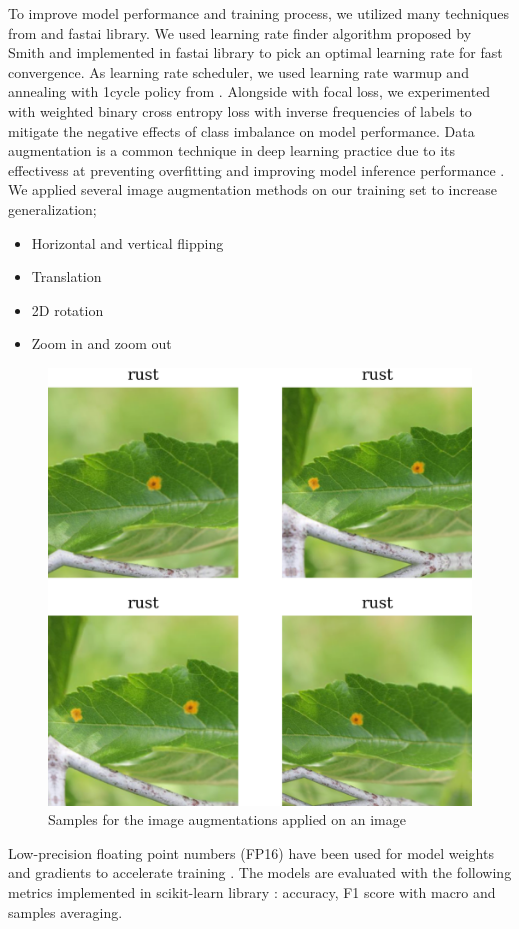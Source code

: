\documentclass[conference]{IEEEtran}
\begin{document}
To improve model performance and training process, 
we utilized many techniques from \cite{BagOfTricks} and fastai \cite{fastai} library.
We used learning rate finder algorithm proposed by Smith \cite{Smith2015}
and implemented in fastai library to pick an optimal learning rate for fast convergence.
As learning rate scheduler, we used learning rate warmup and annealing \cite{BagOfTricks}
with 1cycle policy from \cite{Smith2018}. Alongside with focal loss, 
we experimented with weighted binary cross entropy loss with inverse 
frequencies of labels to mitigate the negative effects of class imbalance 
on model performance. 
Data augmentation is a common technique in deep learning practice due to its 
effectivess at preventing overfitting and improving model inference performance \cite{Shorten2019}.
We applied several image augmentation methods on our training set 
to increase generalization;
\begin{itemize}
    \item Horizontal and vertical flipping
    \item Translation
    \item 2D rotation
    \item Zoom in and zoom out
\end{itemize}

\begin{figure}[h]
    \centerline{\includegraphics[width = 0.45 \textwidth]{image-aug-3x3.png}}
    \caption{Samples for the image augmentations applied on an image}
    \label{fig:image-aug}
\end{figure}

Low-precision floating point numbers (FP16) have been used 
for model weights and gradients to accelerate training 
\cite{Micikevicius2018} \cite{BagOfTricks}.
The models are evaluated with the following metrics implemented 
in scikit-learn library \cite{sklearn_api}: 
accuracy, F1 score with macro and samples averaging.
\end{document}
